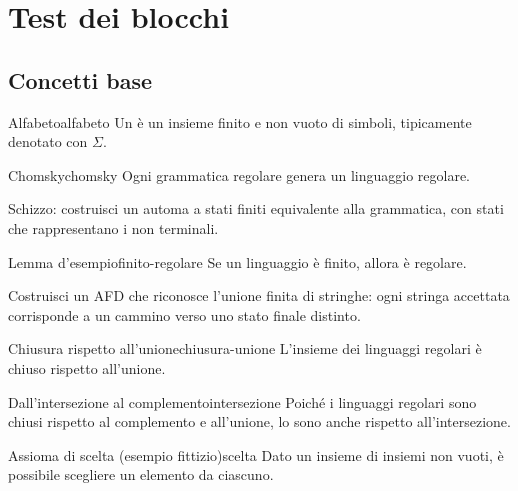 \chapter{Test dei blocchi}

\section{Concetti base}

\begin{definizione}{Alfabeto}{alfabeto}
Un  è un insieme finito e non vuoto di simboli, tipicamente denotato con $\Sigma$.
\end{definizione}

\begin{teorema}{Chomsky}{chomsky}
Ogni grammatica regolare genera un linguaggio regolare.
\end{teorema}

\begin{dimostrazione}
Schizzo: costruisci un automa a stati finiti equivalente alla grammatica,
con stati che rappresentano i non terminali.
\end{dimostrazione}

\begin{lemma}{Lemma d'esempio}{finito-regolare}
Se un linguaggio è finito, allora è regolare.
\end{lemma}

\begin{dimostrazione}
Costruisci un AFD che riconosce l’unione finita di stringhe: ogni stringa accettata
corrisponde a un cammino verso uno stato finale distinto.
\end{dimostrazione}

\begin{proposizione}{Chiusura rispetto all’unione}{chiusura-unione}
L’insieme dei linguaggi regolari è chiuso rispetto all’unione.
\end{proposizione}

\begin{corollario}{Dall’intersezione al complemento}{intersezione}
Poiché i linguaggi regolari sono chiusi rispetto al complemento e all’unione,
lo sono anche rispetto all’intersezione.
\end{corollario}

\begin{assioma}{Assioma di scelta (esempio fittizio)}{scelta}
Dato un insieme di insiemi non vuoti, è possibile scegliere un elemento da ciascuno.
\end{assioma}

